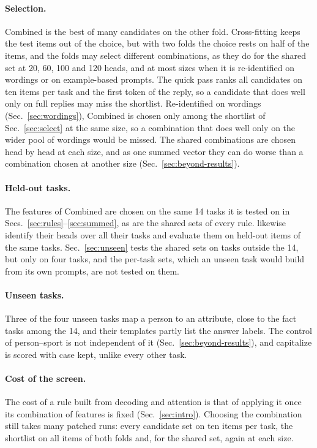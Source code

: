 \documentclass[10pt,a4paper]{article}
\begin{document}
\paragraph{Selection.} Combined is the best of many candidates on the other fold. Cross-fitting keeps the test items out of the choice, but with two folds the choice rests on half of the items, and the folds may select different combinations, as they do for the shared set at 20, 60, 100 and 120 heads, and at most sizes when it is re-identified on wordings or on example-based prompts. The quick pass ranks all candidates on ten items per task and the first token of the reply, so a candidate that does well only on full replies may miss the shortlist. Re-identified on wordings (Sec.~\ref{sec:wordings}), Combined is chosen only among the shortlist of Sec.~\ref{sec:select} at the same size, so a combination that does well only on the wider pool of wordings would be missed. The shared combinations are chosen head by head at each size, and as one summed vector they can do worse than a combination chosen at another size (Sec.~\ref{sec:beyond-results}).

\paragraph{Held-out tasks.} The features of Combined are chosen on the same 14 tasks it is tested on in Secs.~\ref{sec:rules}--\ref{sec:summed}, as are the shared sets of every rule. \citet[Sec.~2.2, App.~E]{davidson2025different} likewise identify their heads over all their tasks and evaluate them on held-out items of the same tasks. Sec.~\ref{sec:unseen} tests the shared sets on tasks outside the 14, but only on four tasks, and the per-task sets, which an unseen task would build from its own prompts, are not tested on them.

\paragraph{Unseen tasks.} Three of the four unseen tasks map a person to an attribute, close to the fact tasks among the 14, and their templates partly list the answer labels. The control of person--sport is not independent of it (Sec.~\ref{sec:beyond-results}), and capitalize is scored with case kept, unlike every other task.

\paragraph{Cost of the screen.} The cost of a rule built from decoding and attention is that of applying it once its combination of features is fixed (Sec.~\ref{sec:intro}). Choosing the combination still takes many patched runs: every candidate set on ten items per task, the shortlist on all items of both folds and, for the shared set, again at each size.
\end{document}
